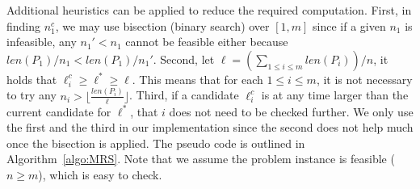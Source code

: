 
Additional heuristics can be applied to reduce the required computation. 
First, in finding $n_1^c$, we may use bisection (binary search) over 
$[1, m]$ since if a given $n_1$ is infeasible, any $n_1' < n_1$ cannot 
be feasible either because $len(P_1)/n_1 < len(P_1)/n_1'$. Second, let 
$\ell = (\sum_{1\le i\le m}len(P_i))/n$, it holds that $\ell_i^c \ge 
\ell^* \ge \ell$. This means that for each $1 \le i \le m$, it is not 
necessary to try any $n_i > \lfloor \frac{len(P_i)}{\ell} \rfloor$. 
Third, if a candidate $\ell_i^c$ is at any time larger than the current 
candidate for $\ell^*$, that $i$ does not need to be checked further. 
We only use the first and the third in our implementation since the 
second does not help much once the bisection is applied. The 
pseudo code is outlined in Algorithm~\ref{algo:MRS}. Note that we 
assume the problem instance is feasible ($n \ge m$), which is easy to check. 

